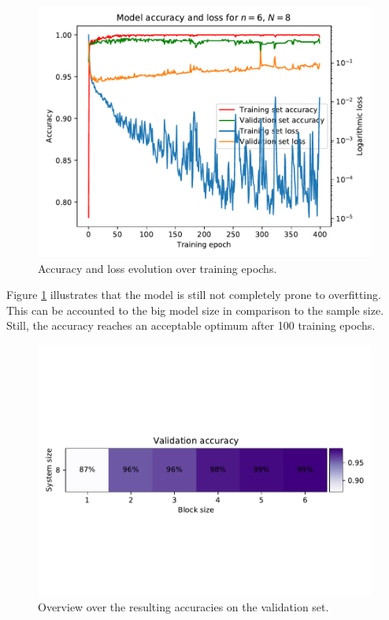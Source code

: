 \documentclass[reprint,amsmath,amssymb,aps,prb]{revtex4-2}
\begin{document}
\begin{figure}[h!]
	\centering
	\includegraphics[width=\linewidth]{../results/accuracy_loss_epochs/N8n6_accuracy_loss_epochs}
	\caption{Accuracy and loss evolution over training epochs.}
	\label{fig:accuracy_loss_epochs}
\end{figure}

Figure \ref{fig:accuracy_loss_epochs} illustrates that the model is still not completely prone to overfitting. This can be accounted to the big model size in comparison to the sample size. Still, the accuracy reaches an acceptable optimum after 100 training epochs.%

\begin{figure}[h!]
	\centering
	\includegraphics[width=\linewidth]{../results/accuracy_loss_epochs/all_validation_accuracy}
	\caption{Overview over the resulting accuracies on the validation set.}
	\label{fig:all_validation_accuracy}
\end{figure}
\end{document}
